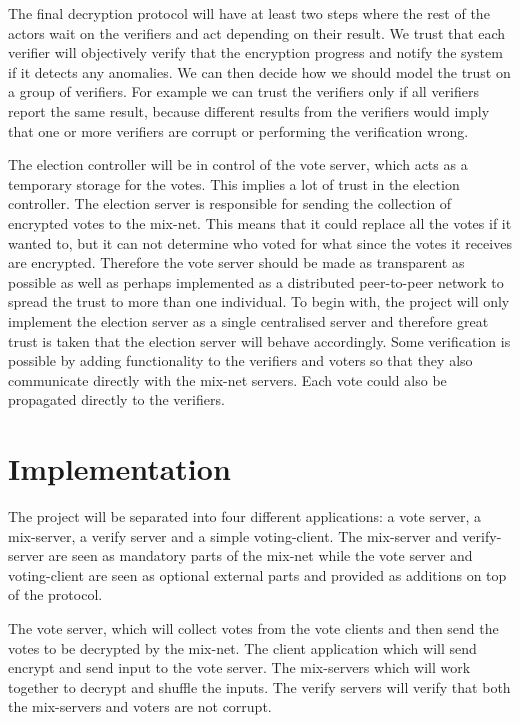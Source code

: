\documentclass[a4paper,11pt]{kth-mag}
\begin{document}
The final decryption protocol will have at least two steps where the rest of the actors wait on the verifiers and act depending on their result. We trust that each verifier will objectively verify that the encryption progress and notify the system if it detects any anomalies. We can then decide how we should model the trust on a group of verifiers. For example we can trust the verifiers only if all verifiers report the same result, because different results from the verifiers would imply that one or more verifiers are corrupt or performing the verification wrong.

The election controller will be in control of the vote server, which acts as a temporary storage for the votes. This implies a lot of trust in the election controller. The election server is responsible for sending the collection of encrypted votes to the mix-net. This means that it could replace all the votes if it wanted to, but it can not determine who voted for what since the votes it receives are encrypted. Therefore the vote server should be made as transparent as possible as well as perhaps implemented as a distributed peer-to-peer network to spread the trust to more than one individual. To begin with, the project will only implement the election server as a single centralised server and therefore great trust is taken that the election server will behave accordingly. Some verification is possible by adding functionality to the verifiers and voters so that they also communicate directly with the mix-net servers. Each vote could also be propagated directly to the verifiers. 



\chapter{Implementation}
The project will be separated into four different applications: a vote server, a mix-server, a verify server and a simple voting-client. The mix-server and verify-server are seen as mandatory parts of the mix-net while the vote server and voting-client are seen as optional external parts and provided as additions on top of the protocol.

The vote server, which will collect votes from the vote clients and then send the votes to be decrypted by the mix-net. The client application which will send encrypt and send input to the vote server. The mix-servers which will work together to decrypt and shuffle the inputs. The verify servers will verify that both the mix-servers and voters are not corrupt.
\end{document}
